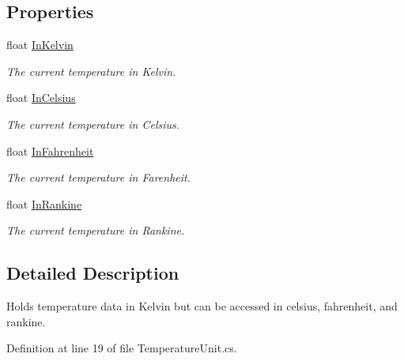 \subsection*{Properties}
\begin{DoxyCompactItemize}
\item 
float \hyperlink{struct_temperature_value_a7ca4eabfab106e1cf112128ae7d63642}{In\+Kelvin}
\begin{DoxyCompactList}\small\item\em The current temperature in Kelvin. \end{DoxyCompactList}\item 
float \hyperlink{struct_temperature_value_ab95968d40504a277284efa58d56feb40}{In\+Celsius}
\begin{DoxyCompactList}\small\item\em The current temperature in Celsius. \end{DoxyCompactList}\item 
float \hyperlink{struct_temperature_value_aafb6e7497cc9fb13fc1be03ddb8514da}{In\+Fahrenheit}
\begin{DoxyCompactList}\small\item\em The current temperature in Farenheit. \end{DoxyCompactList}\item 
float \hyperlink{struct_temperature_value_ad4ddd17eb8022c74e9e905364aa06566}{In\+Rankine}
\begin{DoxyCompactList}\small\item\em The current temperature in Rankine. \end{DoxyCompactList}\end{DoxyCompactItemize}


\subsection{Detailed Description}
Holds temperature data in Kelvin but can be accessed in celsius, fahrenheit, and rankine. 



Definition at line 19 of file Temperature\+Unit.\+cs.



